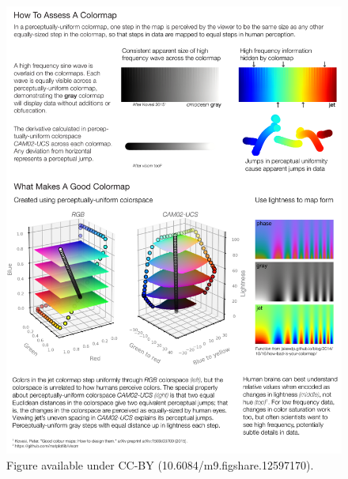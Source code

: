 \documentclass[10pt,journal,compsoc]{IEEEtran}
\begin{document}
\begin{figure}
	\includegraphics[width=\textwidth]{figures/evaluation.pdf}
	\caption{Figure available under CC-BY (10.6084/m9.figshare.12597170).}
	\label{fig:evaluation}
\end{figure}
\end{document}

